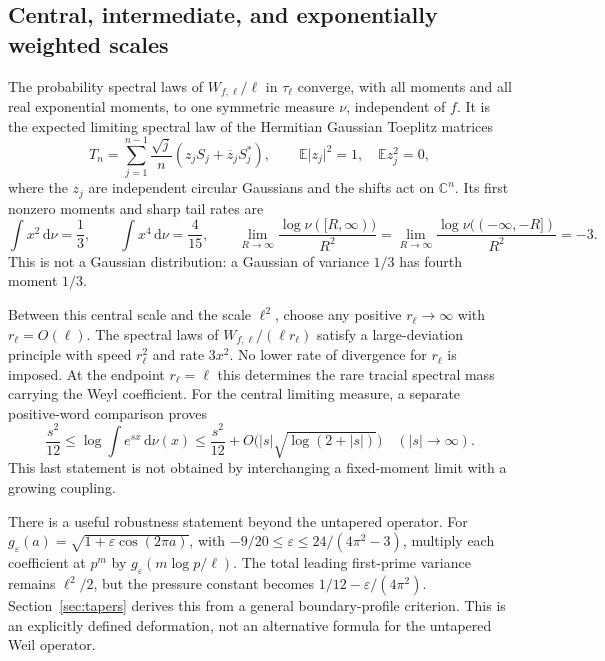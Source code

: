 \documentclass[11pt,reqno]{amsart}
\numberwithin{equation}{section}
\newcommand{\C}{\mathbb C}
\newcommand{\E}{\mathbb E}
\newcommand{\dd}{\,\mathrm d}
\newcommand{\abs}[1]{\lvert#1\rvert}
\begin{document}
\subsection*{Central, intermediate, and exponentially weighted scales}

The probability spectral laws of $W_{f,\ell}/\ell$ in $\tau_\ell$
converge, with all moments and all real exponential moments, to one
symmetric measure $\nu$, independent of $f$. It is the expected
limiting spectral law of the Hermitian Gaussian Toeplitz matrices
\begin{equation}\label{eq:toeplitz-intro}
 T_n=\sum_{j=1}^{n-1}\frac{\sqrt j}{n}
       (z_jS_j+\overline z_jS_j^*),
 \qquad \E\abs{z_j}^2=1,\quad \E z_j^2=0,
\end{equation}
where the $z_j$ are independent circular Gaussians and the shifts
act on $\C^n$. Its first nonzero moments and sharp tail rates are
\begin{equation}\label{eq:central-intro}
 \int x^2\dd\nu=\frac13,\qquad
 \int x^4\dd\nu=\frac4{15},\qquad
 \lim_{R\to\infty}\frac{\log\nu([R,\infty))}{R^2}
 =\lim_{R\to\infty}\frac{\log\nu(( -\infty,-R])}{R^2}=-3.
\end{equation}
This is not a Gaussian distribution: a Gaussian of variance $1/3$
has fourth moment $1/3$.

Between this central scale and the scale $\ell^2$, choose any positive
$r_\ell\to\infty$ with $r_\ell=O(\ell)$. The spectral laws of
$W_{f,\ell}/(\ell r_\ell)$ satisfy a large-deviation principle with
speed $r_\ell^2$ and rate $3x^2$. No lower rate of divergence for
$r_\ell$ is imposed. At the endpoint $r_\ell=\ell$ this determines
the rare tracial spectral mass carrying the Weyl coefficient.
For the central limiting measure, a separate positive-word comparison
proves
\begin{equation}\label{eq:central-mgf-intro}
 \frac{s^2}{12}\le
 \log\int e^{sx}\dd\nu(x)
 \le\frac{s^2}{12}+O\bigl(\abs s\sqrt{\log(2+\abs s)}\bigr)
 \quad (\abs s\to\infty).
\end{equation}
This last statement is not obtained by interchanging a fixed-moment
limit with a growing coupling.

There is a useful robustness statement beyond the untapered operator.
For $g_\varepsilon(a)=\sqrt{1+\varepsilon\cos(2\pi a)}$,
with $-9/20\le\varepsilon\le24/(4\pi^2-3)$, multiply each
coefficient at $p^m$ by $g_\varepsilon(m\log p/\ell)$.
The total leading first-prime variance remains $\ell^2/2$,
but the pressure constant becomes $1/12-\varepsilon/(4\pi^2)$.
Section~\ref{sec:tapers} derives this from a general boundary-profile
criterion. This is an explicitly defined deformation, not an
alternative formula for the untapered Weil operator.
\end{document}
